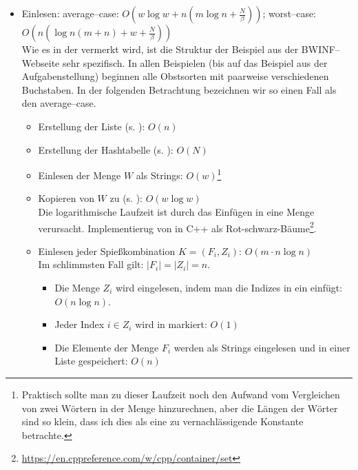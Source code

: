 \begin{itemize}
  \item Einlesen: average--case: $O(w \log w + n (m \log n + \frac{N}{\beta}))$;
  worst--case: $O(n(\log n(m + n) + w + \frac{N}{\beta}))$\\
  Wie es in der  vermerkt wird, ist die Struktur der Beispiel aus der BWINF--Webseite
  sehr spezifisch.
  In allen Beispielen (bis auf das Beispiel aus der Aufgabenstellung) beginnen alle Obstsorten
  mit paarweise verschiedenen Buchstaben. In der folgenden Betrachtung bezeichnen wir so einen 
  Fall als den average--case.

  \begin{itemize}
    \item Erstellung der Liste  (s. ): $O(n)$

    \item Erstellung der Hashtabelle (s. ): $O(N)$

    \item Einlesen der Menge $W$ als Strings: $O(w)$\footnote{Praktisch sollte man zu dieser Laufzeit noch den Aufwand vom Vergleichen von zwei Wörtern in der Menge hinzurechnen, aber die Längen der Wörter sind so klein, dass ich dies als eine zu vernachlässigende Konstante betrachte.\label{foot:vergleich-aufwand}}

    \item Kopieren von $W$ zu  (s. ): $O(w \log w)$\\
    Die logarithmische Laufzeit ist durch das Einfügen in eine Menge verursacht.
    Implementierug von  in C++ als Rot-schwarz-Bäume\footnote{\href{https://en.cppreference.com/w/cpp/container/set}{https://en.cppreference.com/w/cpp/container/set}}. 

    \item Einlesen jeder Spießkombination $K = (F_i, Z_i)$: $O(m \cdot n \log n)$\\
    Im schlimmsten Fall gilt: $|F_i| = |Z_i| = n$.
    \begin{itemize}
      \item Die Menge $Z_i$ wird eingelesen, indem man die Indizes in ein  einfügt: $O(n \log n)$.

      \item Jeder Index $i \in Z_i$ wird in  markiert: $O(1)$

      \item Die Elemente der Menge $F_i$ werden als Strings eingelesen und in einer Liste gespeichert: $O(n)$


\end{itemize}
\end{itemize}
\end{itemize}
